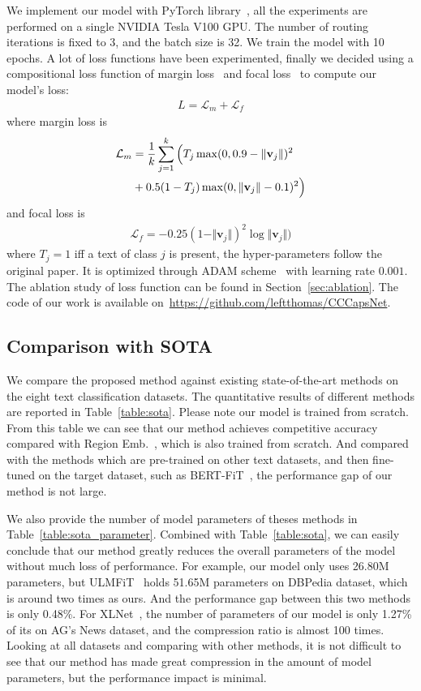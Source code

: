 \documentclass[times,twocolumn,final]{elsarticle}
\begin{document}
We implement our model with PyTorch library~\cite{paszke2019pytorch}, all the experiments are performed on a single NVIDIA Tesla V100 GPU. The number of routing iterations is fixed to 3, and the batch size is 32. We train the model with 10 epochs. A lot of loss functions have been experimented, finally we decided using a compositional loss function of margin loss~\cite{sabour2017dynamic} and focal loss~\cite{lin2017focal} to compute our model's loss:
    \begin{align}
      L = \mathcal{L}_{m} + \mathcal{L}_{f}
    \end{align}
    where margin loss is
    \begin{align}
      \mathcal{L}_{m} & = \frac{1}{k} \sum_{j=1}^k \Big( T_j \max(0, 0.9-\Vert \mathbf{v}_j \Vert)^2 \notag \\ & + 0.5(1-T_j) \max(0, \Vert \mathbf{v}_j \Vert-0.1)^2 \Big)    	
    \end{align}
    and focal loss is
    \begin{align}
      \mathcal{L}_{f} = - 0.25(1-\Vert \mathbf{v}_j \Vert)^2 \log \Vert \mathbf{v}_j \Vert \Big)    	
    \end{align}
where $T_j = 1$ iff a text of class $j$ is present, the hyper-parameters follow the original paper. It is optimized through ADAM scheme~\cite{kingma2015adam} with learning rate $0.001$. The ablation study of loss function can be found in Section~\ref{sec:ablation}. The code of our work is available on~\url{https://github.com/leftthomas/CCCapsNet}.

\subsection{Comparison with SOTA}

We compare the proposed method against existing state-of-the-art methods on the eight text classification datasets. The quantitative results of different methods are reported in Table~\ref{table:sota}. Please note our model is trained from scratch. From this table we can see that our method achieves competitive accuracy compared with Region Emb.~\cite{qiao2018new}, which is also trained from scratch. And compared with the methods which are pre-trained on other text datasets, and then fine-tuned on the target dataset, such as BERT-FiT~\cite{sun2019fine}, the performance gap of our method is not large.

We also provide the number of model parameters of theses methods in Table~\ref{table:sota_parameter}. Combined with Table~\ref{table:sota}, we can easily conclude that our method greatly reduces the overall parameters of the model without much loss of performance. For example, our model only uses 26.80M parameters, but ULMFiT~\cite{howard2018universal} holds 51.65M parameters on DBPedia dataset, which is around two times as ours. And the performance gap between this two methods is only 0.48\%. For XLNet~\cite{yang2019xlnet}, the number of parameters of our model is only 1.27\% of its on AG's News dataset, and the compression ratio is almost 100 times. Looking at all datasets and comparing with other methods, it is not difficult to see that our method has made great compression in the amount of model parameters, but the performance impact is minimal.
\end{document}
